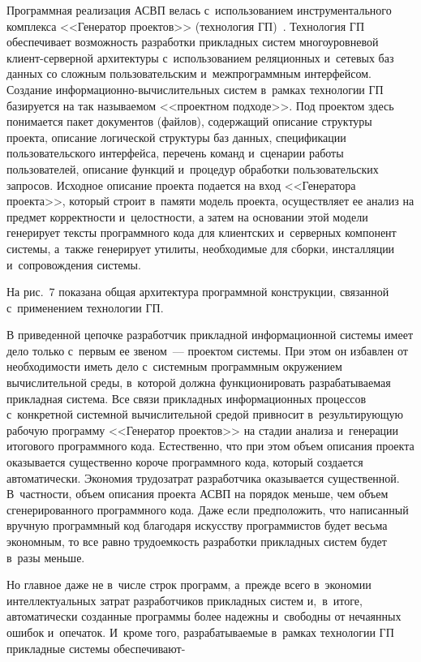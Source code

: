\begin{multicols}{2}
  Программная реализация АСВП велась с~использованием инструментального комплекса 
<<Генератор проектов>> (технология ГП)~\cite{5-fl}. Технология ГП 
обеспечивает возможность разработки приклад\-ных систем многоуровневой  
кли\-ент-сер\-вер\-ной архитектуры с~использованием реляционных и~сетевых 
баз данных со сложным пользовательским и~межпрограммным интерфейсом. 
Создание ин\-фор\-ма\-ци\-он\-но-вы\-чис\-ли\-тель\-ных сис\-тем в~рамках 
технологии ГП базируется на так называемом <<проектном подходе>>. Под 
проектом здесь понимается пакет документов (файлов), содержащий описание 
структуры проекта, описание логической структуры баз данных, спецификации 
пользовательского интерфейса, перечень команд и~сценарии работы 
пользователей, описание функций и~процедур обработки пользовательских 
запросов. Исходное описание проекта подается на вход <<Генератора 
проекта>>, который строит в~памяти модель проекта, осуществляет ее анализ 
на предмет корректности и~целостности, а затем на основании этой модели 
генерирует тексты программного кода для клиентских и~серверных компонент 
системы, а~так\-же ге\-нерирует утилиты, необходимые для сборки, инсталляции 
и~сопровождения системы. 

На рис.~7 показана общая архитектура 
программной конструкции, связанной с~применением технологии ГП.
  


  В приведенной цепочке разработчик прикладной информационной системы 
имеет дело только с~первым ее звеном~--- проектом системы. При этом он 
избавлен от необходимости иметь дело с~системным программным окружением 
вычислительной среды, в~которой должна функционировать разрабатываемая 
прикладная система. Все связи прикладных информационных процессов 
с~конкретной системной вычислительной средой привносит 
в~результирующую рабочую программу <<Генератор проектов>> на стадии 
анализа и~генерации итогового программного кода. Естественно, что при этом 
объем описания проекта оказывается существенно короче программного кода, 
который создается автоматически. Экономия трудозатрат разработчика 
оказывается существенной. В~частности, объем описания проекта АСВП на 
порядок меньше, чем объем сгенерированного программного кода. Даже если 
предположить, что написанный вручную программный код благодаря 
искусству программистов будет весьма экономным, то все равно трудоемкость 
разработки прикладных систем будет в~разы меньше. 

Но главное даже не 
в~числе строк программ, а~прежде всего в~экономии интеллектуальных затрат 
разработчиков прикладных систем и,~в~итоге, автоматически созданные 
программы более надежны и~свободны от нечаянных ошибок и~опечаток.\linebreak 
И~кроме того, разрабатываемые в~рамках технологии ГП прикладные системы 
обеспечивают-\linebreak\vspace*{-12pt}


\end{multicols}
